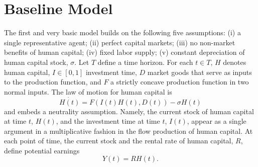 \section{Baseline Model} \label{section:baseline}
\noindent The first and very basic model builds on the following five assumptions: (i) a single representative agent; (ii) perfect capital markets; (iii) no non-market benefits of human capital; (iv) fixed labor supply; (v) constant depreciation of human capital stock, $\sigma$. Let $T$ define a time horizon. For each $t \in T$, $H$ denotes human capital, $I \in [0,1]$ investment time, $D$ market goods that serve as inputs to the production function, and $F$ a strictly concave production function in two normal inputs. The law of motion for human capital is
\begin{equation}
\dot{H(t)} = F \left( I(t) H(t), D(t) \right) - \sigma H(t)
\end{equation}
and embeds a neutrality assumption. Namely, the current stock of human capital at time $t$, $H(t)$, and the investment time at time $t$, $I(t)$, appear as a single argument in a multiplicative fashion in the flow production of human capital. At each point of time, the current stock and the rental rate of human capital, $R$, define potential earnings
\begin{equation}
Y(t) = R H(t).
\end{equation}

